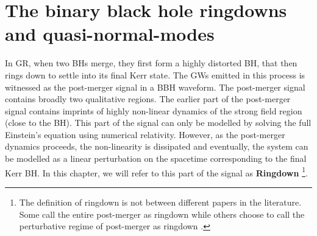 \newcommand{\fni}{\mathscr{I^+}}
\newcommand{\Msun}{\ensuremath{\mathrm{M}_\odot}}

\section{The binary black hole ringdowns and quasi-normal-modes}

In GR, when two BHs merge, they first form a highly distorted BH, that then rings down to settle into its final Kerr state. The GWs emitted in this process is witnessed as the post-merger signal in a BBH waveform. The post-merger signal contains broadly two qualitative regions. The earlier part of the post-merger signal contains imprints of highly non-linear dynamics of the strong field region (close to the BH). This part of the signal can only be modelled by solving the full Einstein's equation using numerical relativity. However, as the post-merger dynamics proceeds, the non-linearity is dissipated and eventually, the system can be modelled as a linear perturbation on the spacetime corresponding to the final Kerr BH. In this chapter, we will refer to this part of the signal as \textbf{Ringdown} \footnote{The definition of ringdown is not between different papers in the literature.  Some call the entire post-merger as ringdown \cite{someone} while others choose to call the perturbative regime of post-merger as ringdown \cite{somneoneelse}. }.

